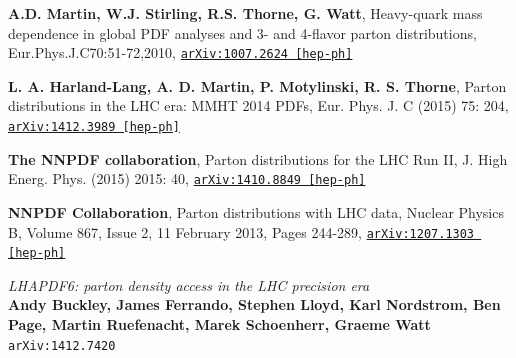 \documentclass[11pt,a4paper,openright,twoside]{report}
\begin{document}
\begin{thebibliography}{9}
	\textbf{A.D. Martin, W.J. Stirling, R.S. Thorne, G. Watt}, Heavy-quark mass dependence in global PDF analyses and 3- and 4-flavor parton distributions, Eur.Phys.J.C70:51-72,2010, \href{https://arxiv.org/abs/1007.2624}{\texttt{arXiv:1007.2624 [hep-ph]}}
	
	\textbf{L. A. Harland-Lang, A. D. Martin, P. Motylinski, R. S. Thorne}, Parton distributions in the LHC era: MMHT 2014 PDFs, Eur. Phys. J. C (2015) 75: 204, \href{https://arxiv.org/abs/1412.3989}{\texttt{arXiv:1412.3989 [hep-ph]}}
	
	\textbf{The NNPDF collaboration}, Parton distributions for the LHC Run II, J. High Energ. Phys. (2015) 2015: 40, \href{https://arxiv.org/abs/1410.8849}{\texttt{arXiv:1410.8849 [hep-ph]}}
	
\textbf{NNPDF Collaboration}, Parton distributions with LHC data, Nuclear Physics B, Volume 867, Issue 2, 11 February 2013, Pages 244-289, \href{https://arxiv.org/abs/1207.1303}{\texttt{arXiv:1207.1303 [hep-ph]}}
	
	\textit{LHAPDF6: parton density access in the LHC precision era}\\
	\textbf{Andy Buckley, James Ferrando, Stephen Lloyd, Karl Nordstrom, Ben Page, Martin Ruefenacht, Marek Schoenherr, Graeme Watt}\\
	\texttt{arXiv:1412.7420}


\end{thebibliography}
\end{document}
